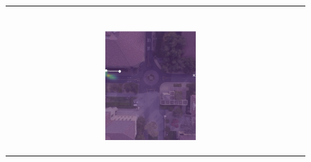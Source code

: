 \documentclass[conference]{IEEEtran}
\begin{document}
\begin{figure}
\begin{tabular}{M{.1\linewidth}  M{.3\linewidth} M{.3\linewidth}  M{.3\linewidth}}
\begin{subfigure}[b]{\linewidth}
	\end{subfigure} \\
	
	 & 
	\begin{subfigure}[b]{\linewidth}
		\includegraphics[width=\linewidth]{./figures/comparison/kit_death_1_2_t=70.png}
	\end{subfigure} &
	\begin{subfigure}[b]{\linewidth}

\end{subfigure}
\end{tabular}
\end{figure}
\end{document}
